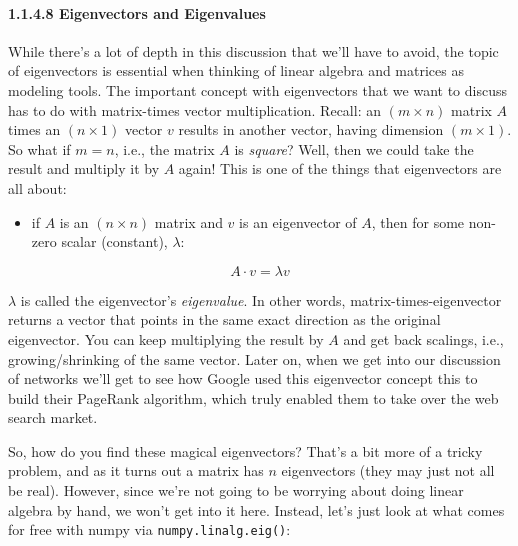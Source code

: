 \documentclass[11pt]{article}
\providecommand{\tightlist}{%
      \setlength{\itemsep}{0pt}\setlength{\parskip}{0pt}}
\begin{document}
    \hypertarget{eigenvectors-and-eigenvalues}{%
\paragraph{1.1.4.8 Eigenvectors and
Eigenvalues}\label{eigenvectors-and-eigenvalues}}

While there's a lot of depth in this discussion that we'll have to
avoid, the topic of eigenvectors is essential when thinking of linear
algebra and matrices as modeling tools. The important concept with
eigenvectors that we want to discuss has to do with matrix-times vector
multiplication. Recall: an \((m \times n)\) matrix \(A\) times an
\((n \times 1)\) vector \(v\) results in another vector, having
dimension \((m \times 1)\). So what if \(m = n\), i.e., the matrix \(A\)
is \emph{square}? Well, then we could take the result and multiply it by
\(A\) again! This is one of the things that eigenvectors are all about:

\begin{itemize}
\tightlist
\item
  if \(A\) is an \((n \times n)\) matrix and \(v\) is an eigenvector of
  \(A\), then for some non-zero scalar (constant), \(\lambda\):
\end{itemize}

\[A\cdot v = \lambda v\]

\(\lambda\) is called the eigenvector's \emph{eigenvalue}. In other
words, matrix-times-eigenvector returns a vector that points in the same
exact direction as the original eigenvector. You can keep multiplying
the result by \(A\) and get back scalings, i.e., growing/shrinking of
the same vector. Later on, when we get into our discussion of networks
we'll get to see how Google used this eigenvector concept this to build
their PageRank algorithm, which truly enabled them to take over the web
search market.

So, how do you find these magical eigenvectors? That's a bit more of a
tricky problem, and as it turns out a matrix has \(n\) eigenvectors
(they may just not all be real). However, since we're not going to be
worrying about doing linear algebra by hand, we won't get into it here.
Instead, let's just look at what comes for free with numpy via
\texttt{numpy.linalg.eig()}:
\end{document}
